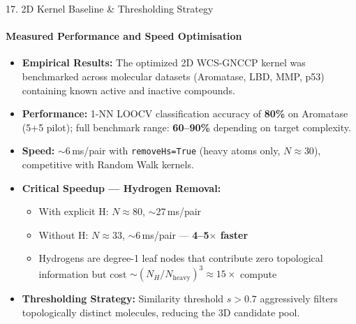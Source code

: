 \documentclass[aspectratio=169, 11pt]{beamer}
\begin{document}
\begin{frame}{17. 2D Kernel Baseline \& Thresholding Strategy}
\framesubtitle{Measured Performance and Speed Optimisation}

\begin{itemize}
    \item \textbf{Empirical Results:} The optimized 2D WCS-GNCCP kernel was benchmarked across molecular datasets (Aromatase, LBD, MMP, p53) containing known active and inactive compounds.
    \item \textbf{Performance:} 1-NN LOOCV classification accuracy of \textbf{80\%} on Aromatase (5+5 pilot); full benchmark range: \textbf{60--90\%} depending on target complexity.
    \item \textbf{Speed:} ${\sim}6$\,ms/pair with \texttt{removeHs=True} (heavy atoms only, $N{\approx}30$), competitive with Random Walk kernels.
    \item \textbf{Critical Speedup --- Hydrogen Removal:}
    \begin{itemize}
        \item With explicit H: $N{\approx}80$, ${\sim}27$\,ms/pair
        \item Without H: $N{\approx}33$, ${\sim}6$\,ms/pair --- \textbf{4--5$\times$ faster}
        \item Hydrogens are degree-1 leaf nodes that contribute zero topological information but cost $\sim(N_H/N_{\text{heavy}})^3 \approx 15\times$ compute
    \end{itemize}
    \item \textbf{Thresholding Strategy:} Similarity threshold $s > 0.7$ aggressively filters topologically distinct molecules, reducing the 3D candidate pool.
\end{itemize}
\end{frame}
\end{document}
